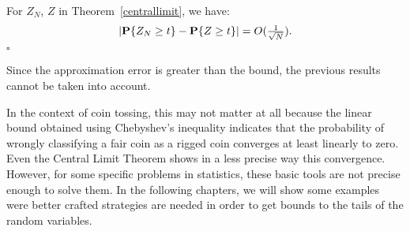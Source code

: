 \begin{theorem}\label{berryessen}
  For $Z_N$, $Z$ in Theorem~\ref{centrallimit}, we have:
  \[ \left|\P\{Z_N \geq t\} - \P\{Z \geq t\}\right| = O(\tfrac{1}{\sqrt{N}}). \]
  \hfill $\square$
\end{theorem}

Since the approximation error is greater than the bound, the previous results cannot be taken into account.

In the context of coin tossing, this may not matter at all because the linear bound obtained using Chebyshev's inequality indicates that the probability of wrongly classifying a fair coin as a rigged coin converges at least linearly to zero. Even the Central Limit Theorem shows in a less precise way this convergence. However, for some specific problems in statistics, these basic tools are not precise enough to solve them. In the following chapters, we will show some examples were better crafted strategies are needed in order to get bounds to the tails of the random variables.